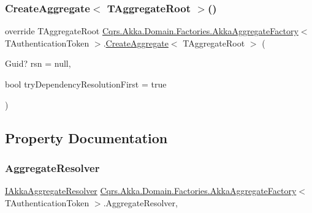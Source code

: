 \subsubsection{\texorpdfstring{Create\+Aggregate$<$ T\+Aggregate\+Root $>$()}{CreateAggregate< TAggregateRoot >()}}
{\footnotesize\ttfamily override T\+Aggregate\+Root \hyperlink{classCqrs_1_1Akka_1_1Domain_1_1Factories_1_1AkkaAggregateFactory}{Cqrs.\+Akka.\+Domain.\+Factories.\+Akka\+Aggregate\+Factory}$<$ T\+Authentication\+Token $>$.\hyperlink{classCqrs_1_1Domain_1_1Factories_1_1AggregateFactory_aa60839e14ef01b3971067e1f154ee6b4_aa60839e14ef01b3971067e1f154ee6b4}{Create\+Aggregate}$<$ T\+Aggregate\+Root $>$ (\begin{DoxyParamCaption}\item[{Guid?}]{rsn = {\ttfamily null},  }\item[{bool}]{try\+Dependency\+Resolution\+First = {\ttfamily true} }\end{DoxyParamCaption})}



\subsection{Property Documentation}
\mbox{\label{classCqrs_1_1Akka_1_1Domain_1_1Factories_1_1AkkaAggregateFactory_ae83aa4aa5cbe5fe0cc0cea41de002218_ae83aa4aa5cbe5fe0cc0cea41de002218}} 
\subsubsection{\texorpdfstring{Aggregate\+Resolver}{AggregateResolver}}
{\footnotesize\ttfamily \hyperlink{interfaceCqrs_1_1Akka_1_1Domain_1_1IAkkaAggregateResolver}{I\+Akka\+Aggregate\+Resolver} \hyperlink{classCqrs_1_1Akka_1_1Domain_1_1Factories_1_1AkkaAggregateFactory}{Cqrs.\+Akka.\+Domain.\+Factories.\+Akka\+Aggregate\+Factory}$<$ T\+Authentication\+Token $>$.Aggregate\+Resolver\hspace{0.3cm}{\ttfamily [get]}, {\ttfamily [protected]}}

